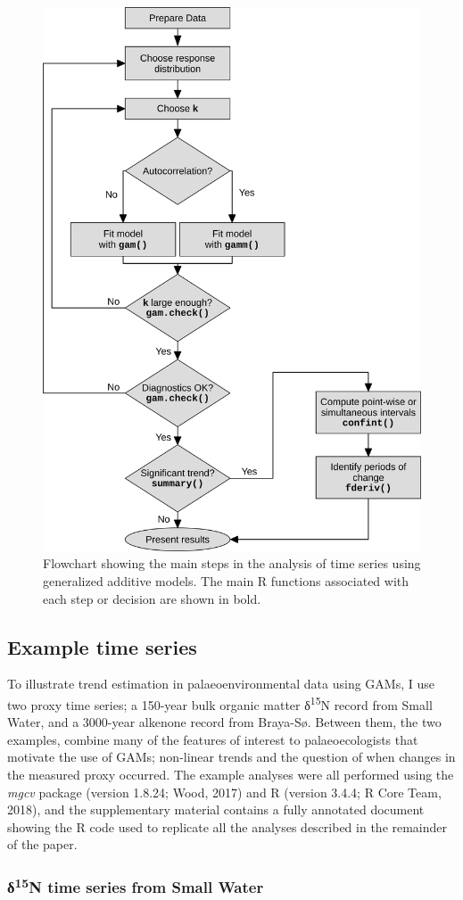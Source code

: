 \documentclass[12pt,]{article}
\begin{document}
\begin{figure}

{\centering \includegraphics[width=0.4\linewidth]{manual-figures/flow-diagram} 

}

\caption{Flowchart showing the main steps in the analysis of time series using generalized additive models. The main R functions associated with each step or decision are shown in bold.}\label{fig:flowchart}
\end{figure}

\subsection{Example time series}\label{example-time-series}

To illustrate trend estimation in palaeoenvironmental data using GAMs, I
use two proxy time series; a 150-year bulk organic matter
δ\textsuperscript{15}N record from Small Water, and a 3000-year alkenone
record from Braya-Sø. Between them, the two examples, combine many of
the features of interest to palaeoecologists that motivate the use of
GAMs; non-linear trends and the question of when changes in the measured
proxy occurred. The example analyses were all performed using the
\emph{mgcv} package (version 1.8.24; Wood, 2017) and R (version 3.4.4; R
Core Team, 2018), and the supplementary material contains a fully
annotated document showing the R code used to replicate all the analyses
described in the remainder of the paper.

\subsubsection{\texorpdfstring{δ\textsuperscript{15}N time series from
Small
Water}{δ15N time series from Small Water}}\label{15n-time-series-from-small-water}
\end{document}
